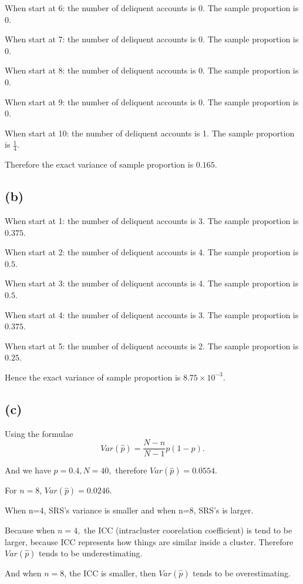 \documentclass[12pt]{article}%
\begin{document}
When start at 6: the number of deliquent accounts is 0. The sample proportion is $0.$ 

When start at 7: the number of deliquent accounts is 0. The sample proportion is $0.$ 

When start at 8: the number of deliquent accounts is 0. The sample proportion is $0.$ 

When start at 9: the number of deliquent accounts is 0. The sample proportion is $0.$ 

When start at 10: the number of deliquent accounts is 1. The sample proportion is $\frac{1}{4}.$ 

Therefore the exact variance of sample proportion is $0.165.$

\subsection{(b)}
When start at 1: the number of deliquent accounts is 3. The sample proportion is $0.375.$

When start at 2: the number of deliquent accounts is 4. The sample proportion is $0.5.$

When start at 3: the number of deliquent accounts is 4. The sample proportion is $0.5.$

When start at 4: the number of deliquent accounts is 3. The sample proportion is $0.375.$

When start at 5: the number of deliquent accounts is 2. The sample proportion is $0.25.$

Hence the exact variance of sample proportion is $8.75\times 10^{-3}.$

\subsection{(c)}
Using the formulae $$Var(\hat{p})=\frac{N-n}{N-1}p(1-p).$$

And we have $p=0.4, N=40,$ therefore $Var(\hat{p})=0.0554.$

For $n=8$, $Var(\hat{p})=0.0246.$

When n=4, SRS's variance is smaller and when n=8, SRS's is larger.

Because when $n=4,$ the ICC (intracluster coorelation coefficient) is tend to be larger, because
ICC represents how things are similar inside a cluster. Therefore $Var(\hat{p})$ tends to be 
underestimating.

And when $n=8$, the ICC is smaller, then $Var(\hat{p})$ tends to be overestimating.
\end{document}
